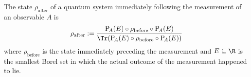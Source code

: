     \begin{tcolorbox}[colframe=blue!10!black,before skip=10pt]
        \begin{axiom}
            The state $\rho_{\mathrm{after}}$ of a quantum system immediately following the measurement of an observable $A$ is
            \begin{equation*}
                \rho_{\mathrm{after}} := \frac{\mathrm{P}_{\!A}(E)\circ\rho_{\mathrm{before}}\circ\mathrm{P}_{\!A}(E)}{\Tr(\mathrm{P}_{\!A}(E)\circ\rho_{\mathrm{before}}\circ\mathrm{P}_{\!A}(E))}
            \end{equation*}
            where $\rho_{\mathrm{before}}$ is the state immediately preceding the measurement and $E\subseteq\R$ is the smallest Borel set in which the actual outcome of the measurement happened to lie.
        \end{axiom}
    \end{tcolorbox}
























